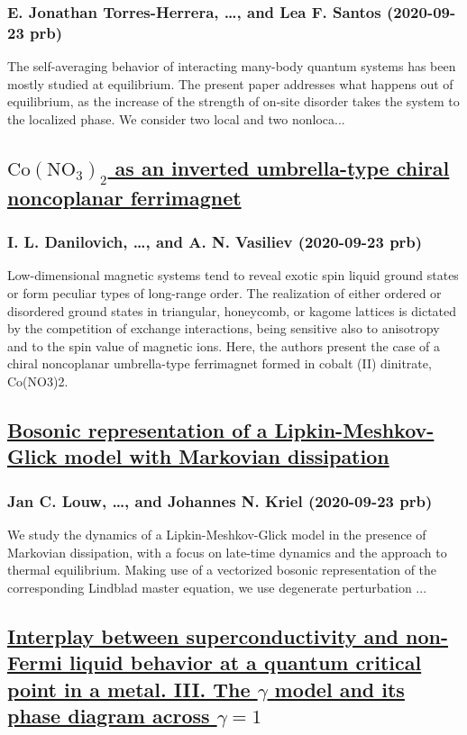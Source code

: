 \subsubsection*{E. Jonathan Torres-Herrera, \dots, and Lea F. Santos (2020-09-23 prb)}
The self-averaging behavior of interacting many-body quantum systems has been mostly studied at equilibrium. The present paper addresses what happens out of equilibrium, as the increase of the strength of on-site disorder takes the system to the localized phase. We consider two local and two nonloca...
\subsection*{\href{http://link.aps.org/doi/10.1103/PhysRevB.102.094429}{$\mathrm{Co}{({\mathrm{NO}}_{3})}_{2}$ as an inverted umbrella-type chiral noncoplanar ferrimagnet}}
\subsubsection*{I. L. Danilovich, \dots, and A. N. Vasiliev (2020-09-23 prb)}
Low-dimensional magnetic systems tend to reveal exotic spin liquid ground states or form peculiar types of long-range order. The realization of either ordered or disordered ground states in triangular, honeycomb, or kagome lattices is dictated by the competition of exchange interactions, being sensitive also to anisotropy and to the spin value of magnetic ions. Here, the authors present the case of a chiral noncoplanar umbrella-type ferrimagnet formed in cobalt (II) dinitrate, Co(NO3)2.
\subsection*{\href{http://link.aps.org/doi/10.1103/PhysRevB.102.094430}{Bosonic representation of a Lipkin-Meshkov-Glick model with Markovian dissipation}}
\subsubsection*{Jan C. Louw, \dots, and Johannes N. Kriel (2020-09-23 prb)}
We study the dynamics of a Lipkin-Meshkov-Glick model in the presence of Markovian dissipation, with a focus on late-time dynamics and the approach to thermal equilibrium. Making use of a vectorized bosonic representation of the corresponding Lindblad master equation, we use degenerate perturbation ...
\subsection*{\href{http://link.aps.org/doi/10.1103/PhysRevB.102.094516}{Interplay between superconductivity and non-Fermi liquid behavior at a quantum critical point in a metal. III. The $γ$ model and its phase diagram across $γ=1$}}
